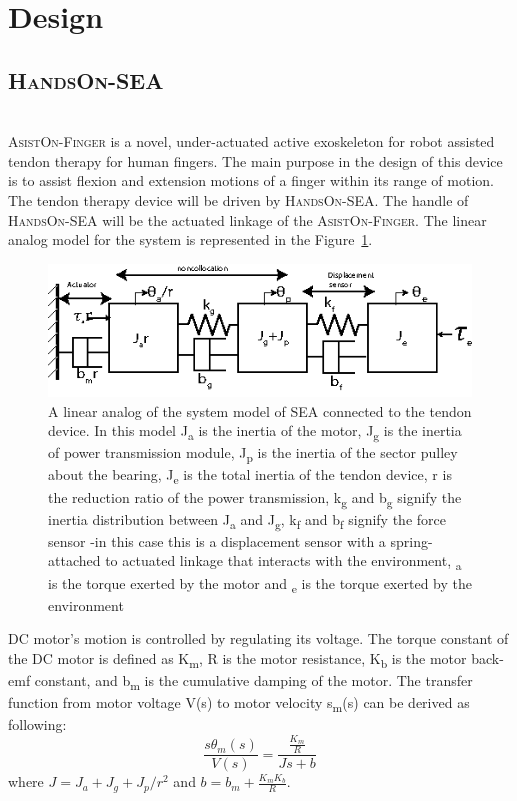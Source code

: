 \documentclass[a4paper,12pt]{article}
\begin{document}
\section{Design}
\subsection{\textsc{HandsOn-SEA}}\\

\textsc{AsistOn-Finger} is a novel, under-actuated active exoskeleton for robot assisted tendon therapy for human fingers. The main purpose in the design of this device is to assist flexion and extension motions of a finger within its range of motion. The tendon therapy device will be driven by \textsc{HandsOn-SEA}. The handle of \textsc{HandsOn-SEA} will be the actuated linkage of the \textsc{AsistOn-Finger}. The linear analog model for the system is represented in the Figure~\ref{fig:model}.
\begin{figure}[h]
\centering
\includegraphics[scale=2]{sea.eps}
\caption{A linear analog of the system model of SEA connected to the tendon device. In this model J\textsubscript{a} is the inertia of the motor, J\textsubscript{g} is the inertia of power transmission module, J\textsubscript{p} is the inertia of the sector pulley about the bearing, J\textsubscript{e} is the total inertia of the tendon device, r is the reduction ratio of the power transmission, k\textsubscript{g} and b\textsubscript{g} signify the inertia distribution between J\textsubscript{a} and J\textsubscript{g}, k\textsubscript{f} and b\textsubscript{f} signify the force sensor -in this case this is a displacement sensor with a spring- attached to actuated linkage that interacts with the environment, \texttau  \textsubscript{a} is the torque exerted by the motor and \texttau  \textsubscript{e} is the torque exerted by the environment }
\label{fig:model}
\end{figure}

DC motor's motion is controlled by regulating its voltage. The torque constant of the DC motor is defined as K\textsubscript{m}, R is  the motor resistance,  K\textsubscript{b} is the motor back-emf constant, and b\textsubscript{m} is the cumulative damping of the motor. The transfer function from motor voltage V(s) to motor velocity s\texttheta\textsubscript{m}(s) can be derived as following:
\begin{equation}
\frac{s\theta_m(s)}{V(s)}=\frac{\frac{K_m}{R}}{Js+b}
\end{equation}
where \(J=J_a+J_g+J_p/r^2\) and \(b=b_m+\frac{K_mK_b}{R}\).
\end{document}
